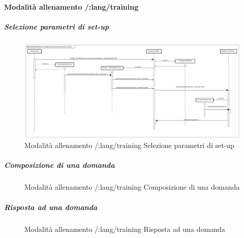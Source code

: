 \paragraph{Modalità allenamento /:lang/training}

\subparagraph{Selezione parametri di set-up}

\label{Modalità allenamento /:lang/training Selezione parametri di set-up}

\begin{figure}[ht]
	\centering
	\includegraphics[scale=0.25,keepaspectratio]{UML/DiagrammiDiSequenza/Front-End/Training_setUp.png}
	\caption{Modalità allenamento /:lang/training Selezione parametri di set-up}
\end{figure} \FloatBarrier

\subparagraph{Composizione di una domanda}

\label{Modalità allenamento /:lang/training Composizione di una domanda}

\begin{figure}[ht]
	\centering
	\caption{Modalità allenamento /:lang/training Composizione di una domanda}
\end{figure} \FloatBarrier

\subparagraph{Risposta ad una domanda}

\label{Modalità allenamento /:lang/training Risposta ad una domanda}

\begin{figure}[ht]
	\centering
	\caption{Modalità allenamento /:lang/training Risposta ad una domanda}
\end{figure} \FloatBarrier
